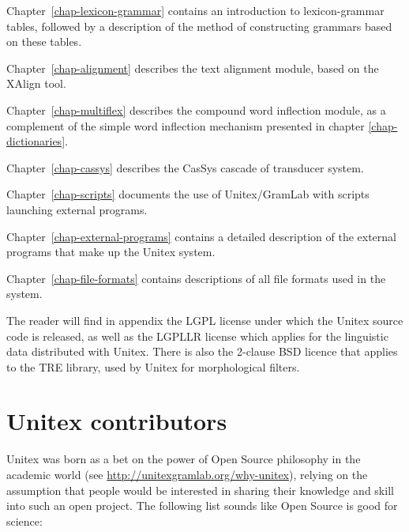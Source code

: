 \bigskip \noindent Chapter~\ref{chap-lexicon-grammar} contains an
introduction to lexicon-grammar tables, followed by a description of the method of constructing grammars based on these
tables.

\bigskip \noindent Chapter~\ref{chap-alignment} describes the text
alignment module, based on the XAlign tool.

\bigskip \noindent Chapter~\ref{chap-multiflex} describes the compound word
inflection module, as a complement of the simple word inflection mechanism
presented in chapter \ref{chap-dictionaries}.

\bigskip \noindent Chapter~\ref{chap-cassys} describes the CasSys cascade of transducer system.

\bigskip \noindent Chapter~\ref{chap-scripts} documents the use of Unitex/GramLab
with scripts launching external programs.

\bigskip \noindent Chapter~\ref{chap-external-programs} contains a
detailed description of the external programs that make up the Unitex system.

\bigskip \noindent Chapter~\ref{chap-file-formats} contains
descriptions of all file formats used in the system. 


\bigskip \noindent The reader will find in appendix the LGPL license
under which the Unitex source code is released, as well as the LGPLLR license
which applies for the linguistic data distributed with Unitex. There is also
the 2-clause BSD licence that applies to the TRE library, used by Unitex for 
morphological filters.


\section*{Unitex contributors}
Unitex was born as a bet on the power of Open Source philosophy in the academic
world (see \url{http://unitexgramlab.org/why-unitex}), 
relying on the assumption that people would be interested in sharing
their knowledge and skill into such an open project. The following list
sounds like Open Source is good for science:

